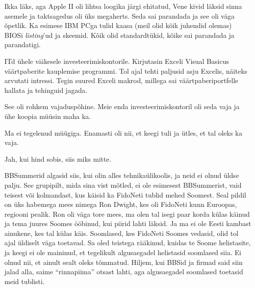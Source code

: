 
Ikka läks, aga Apple II oli 
lihtsa loogika järgi ehitatud, Vene kivid läksid sinna asemele ja taktsagedus oli üks 
megaherts. Seda sai parandada ja see oli väga õpetlik. Ka 
esimese IBM PCga tulid kaasa (meil olid 
kõik juhendid olemas) BIOSi \emph{listing}'ud ja skeemid. Kõik olid 
standardtükid, kõike sai parandada ja parandatigi. 


ITd ühele väikesele investeerimiskontorile. Kirjutasin 
Exceli Visual Basicus väärtpaberite 
kauplemise programmi. Tol ajal tehti paljusid asju Excelis, näiteks arvutati intressi. Tegin suured Exceli makrod, millega sai 
väärtpaberiportfelle hallata ja tehinguid jagada. 


See oli rohkem vajaduspõhine. Meie enda investeerimiskontoril oli seda 
vaja ja ühe koopia müüsin maha ka. 


Ma ei tegelenud müügiga. Enamasti oli nii, et keegi tuli ja ütles, et tal 
oleks ka vaja. 


Jah, kui hind sobis, siis miks mitte.


BBSummerid algasid siis, kui olin alles tehnikaülikoolis, ja neid ei olnud üldse palju. See grupipilt, mida sina vist 
mõtled, ei ole esimesest BBSummerist, vaid teisest või kolmandast, kus käisid ka FidoNeti tublid mehed Soomest. Seal 
pildil on üks habemega mees nimega Ron Dwight, kes 
oli FidoNeti kunn Euroopas, regiooni pealik. Ron 
oli väga tore mees, ma olen tal isegi paar korda külas käinud ja tema juures Soomes 
ööbinud, kui piirid lahti läksid. Ja ma ei ole Eesti kambast ainukene, kes tal
külas käis. 
Soomlased, kes FidoNeti Soomes vedasid, olid tol ajal üldiselt väga toetavad. 
Sa oled teistega rääkinud, kuidas te Soome helistasite, ja keegi ei ole 
maininud, et tegelikult algusaegadel helistasid soomlased siia. Ei olnud nii, 
et ainult sealt oleks tõmmatud. Hiljem, kui BBSid ja firmad said siin jalad 
alla, saime \enquote{rinnapiima} otsast lahti, aga algusaegadel 
soomlased toetasid meid tublisti. 

